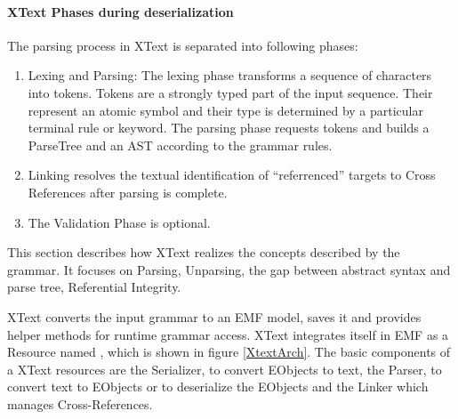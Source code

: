 \paragraph{XText Phases during deserialization}
The parsing process in XText is separated into following phases:
\begin{enumerate}
	\item Lexing and Parsing: The lexing phase transforms a sequence of characters into tokens. Tokens are a strongly typed part of the input sequence. Their represent an atomic symbol and their type is determined by a particular terminal rule or keyword. The parsing phase requests tokens and builds a ParseTree and an AST according to the grammar rules.
	\item Linking resolves the textual identification of ``referrenced'' targets to Cross References after parsing is complete.
	\item The Validation Phase is optional.
\end{enumerate}

This section describes how XText realizes the  concepts described by the grammar. It focuses on Parsing, Unparsing, the gap between abstract syntax and parse tree, Referential Integrity. 

XText converts the input grammar to an EMF model, saves it and provides helper methods for runtime grammar access. XText integrates itself in EMF as a Resource named , which is shown in figure \ref{XtextArch}.  The basic components of a XText resources are the Serializer, to convert EObjects to text, the Parser, to convert text to EObjects or to deserialize the EObjects and the Linker which manages Cross-References. 

